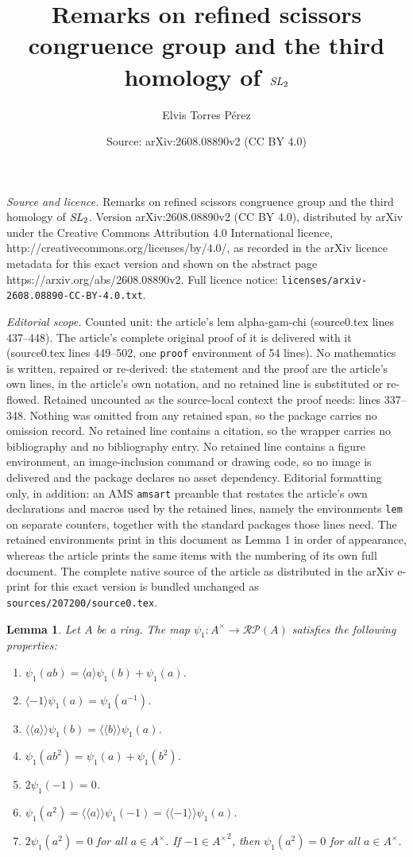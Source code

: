 \documentclass[10pt,a4paper]{amsart}
\title{Remarks on refined scissors congruence group and the third homology of \texorpdfstring{$\SL_2$}{Lg}}
\author{Elvis Torres P\'erez}
\date{Source: arXiv:2608.08890v2 (CC BY 4.0)}
\newtheorem{lem}{Lemma}
\newcommand{\Lan}{\langle \! \langle}
\newcommand{\RP}{\mathcal{RP}}
\newcommand{\Ran}{\rangle \! \rangle}
\newcommand{\SL}{\mathit{{\rm SL}}}
\renewcommand{\aa}{{A^\times}}
\newcommand{\lan}{\langle}
\newcommand{\ran}{\rangle}
\begin{document}
\maketitle

\noindent\emph{Source and licence.} Remarks on refined scissors congruence group and the third homology of \texorpdfstring{$\SL_2$}{Lg}. Version arXiv:2608.08890v2 (CC BY 4.0), distributed by arXiv under the Creative Commons Attribution 4.0 International licence, http://creativecommons.org/licenses/by/4.0/, as recorded in the arXiv licence metadata for this exact version and shown on the abstract page https://arxiv.org/abs/2608.08890v2. Full licence notice: \texttt{licenses/arxiv-2608.08890-CC-BY-4.0.txt}.\par\smallskip

\noindent\textit{Editorial scope.} Counted unit: the article's lem alpha-gam-chi (source0.tex lines 437--448). The article's complete original proof of it is delivered with it (source0.tex lines 449--502, one \texttt{proof} environment of 54 lines). No mathematics is written, repaired or re-derived: the statement and the proof are the article's own lines, in the article's own notation, and no retained line is substituted or re-flowed.  Retained uncounted as the source-local context the proof needs: lines 337--348.  Nothing was omitted from any retained span, so the package carries no omission record.  No retained line contains a citation, so the wrapper carries no bibliography and no bibliography entry.  No retained line contains a figure environment, an image-inclusion command or drawing code, so no image is delivered and the package declares no asset dependency.  Editorial formatting only, in addition: an AMS \texttt{amsart} preamble that restates the article's own declarations and macros used by the retained lines, namely the environments \texttt{lem} on separate counters, together with the standard packages those lines need.  The retained environments print in this document as Lemma 1 in order of appearance, whereas the article prints the same items with the numbering of its own full document.  The complete native source of the article as distributed in the arXiv e-print for this exact version is bundled unchanged as \texttt{sources/207200/source0.tex}.
\begin{lem}\label{lem-psi1}
    Let $A$ be a ring. The map $\psi_1:\aa\to\RP(A)$ satisfies the following properties:
    \begin{enumerate}
        \item $\psi_1(ab)=\lan a\ran\psi_1(b)+\psi_1(a)$.
        \item $\lan -1\ran\psi_1(a)=\psi_1(a^{-1})$.
        \item $\Lan a\Ran\psi_1(b)=\Lan b\Ran\psi_1(a)$.
        \item $\psi_1(ab^2)=\psi_1(a)+\psi_1(b^2)$.
        \item $2\psi_1(-1)=0$.
        \item $\psi_1(a^2)=\Lan a\Ran\psi_1(-1)=\Lan -1\Ran\psi_1(a)$.
        \item $2\psi_1(a^2)=0$ for all $a\in\aa$. If $-1\in\aa^2$, then $\psi_1(a^2)=0$ for all $a\in\aa$.
    \end{enumerate}
\end{lem}
\end{document}
